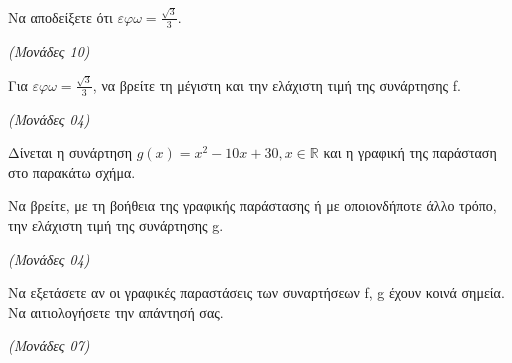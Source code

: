 \documentclass[11pt,a4paper,twoside]{book}
\newcommand{\monades}[1]{\hfill \textit{(Μονάδες #1)}}
\begin{document}
\begin{alist}
\item

\end{alist}
\begin{alist}
\item
  Να αποδείξετε ότι $\varepsilon\varphi\omega = \frac{\sqrt{3}}{3}$.

\monades{10}


\end{alist}
\begin{alist}
\item
  Για $\varepsilon\varphi\omega = \frac{\sqrt{3}}{3}$, να βρείτε τη μέγιστη και την ελάχιστη τιμή της συνάρτησης f.

\monades{04}

\item Δίνεται η συνάρτηση $g(x) = x^2 - 10x + 30, x \in \mathbb{R}$ και η γραφική της παράσταση στο παρακάτω σχήμα.


\begin{center}


\end{center}


\end{alist}
\begin{alist}
\item
  Να βρείτε, με τη βοήθεια της γραφικής παράστασης ή με οποιονδήποτε άλλο τρόπο, την ελάχιστη τιμή της συνάρτησης g.

\monades{04}


\end{alist}
\begin{alist}
\item
  Να εξετάσετε αν οι γραφικές παραστάσεις των συναρτήσεων f, g έχουν κοινά σημεία. Να αιτιολογήσετε την απάντησή σας.

\monades{07}
\end{alist}
\end{document}
